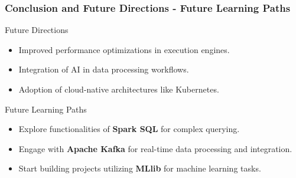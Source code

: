 \documentclass[aspectratio=169]{beamer}
\begin{document}
\begin{frame}[fragile]
    \frametitle{Conclusion and Future Directions - Future Learning Paths}
    \begin{block}{Future Directions}
        \begin{itemize}
            \item Improved performance optimizations in execution engines.
            \item Integration of AI in data processing workflows.
            \item Adoption of cloud-native architectures like Kubernetes.
        \end{itemize}
    \end{block}

    \begin{block}{Future Learning Paths}
        \begin{itemize}
            \item Explore functionalities of \textbf{Spark SQL} for complex querying.
            \item Engage with \textbf{Apache Kafka} for real-time data processing and integration.
            \item Start building projects utilizing \textbf{MLlib} for machine learning tasks.
        \end{itemize}
    \end{block}
\end{frame}
\end{document}

